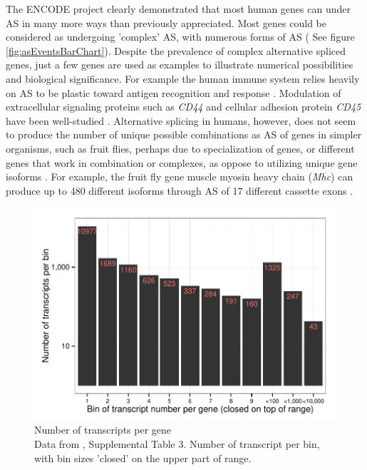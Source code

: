 The ENCODE project clearly demonstrated that most human genes can under AS in many more ways than previously appreciated. Most genes could be considered as undergoing 'complex' AS, with numerous forms of AS ( See figure \ref{fig:asEventsBarChart}). Despite the prevalence of complex alternative spliced genes, just a few genes are used as examples to illustrate numerical possibilities and biological significance. For example the human immune system relies heavily on AS to be plastic toward antigen recognition and response \citep{Lynch2004}. Modulation of extracellular signaling proteins such as \textit{CD44} and cellular adhesion protein \textit{CD45} have been well-studied \citep{Zikherman2008,Ponta2003b}. Alternative splicing in humans, however, does not seem to produce the number of unique possible combinations as AS of genes in simpler organisms, such as fruit flies, perhaps due to specialization of genes, or different genes that work in combination or complexes, as oppose to utilizing unique gene isoforms \citep{Park2007}. For example, the fruit fly gene muscle myosin heavy chain (\textit{Mhc}) can produce up to 480 different isoforms through AS of 17 different cassette exons \citep{Bernstein1983a}.  

\begin{figure}[htbp]
	\centering 
	\includegraphics{Figures/Chapter1/NumberOFTranscriptsPerFlyGene.pdf}
	\caption[Number of transcripts per \flies{} gene]
	{
		Number of transcripts per \flies{} gene\\[0.25cm]
		Data from \citep{Brown2014}, Supplemental Table 3. Number of transcript per bin, with bin sizes 'closed' on the upper part of range.
	}
	\label{fig:txPerFlyGene}
\end{figure}

